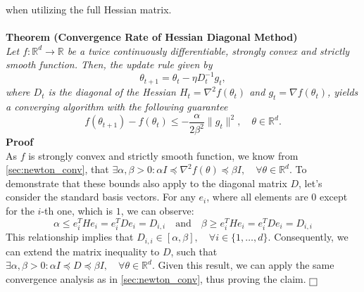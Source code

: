 when utilizing the full Hessian matrix.
\\\\
\noindent\textbf{Theorem (Convergence Rate of Hessian Diagonal Method) \cite{yao2021adahessian}} \\
\textit{Let $f: \mathbb{R}^d \to \mathbb{R}$ be a twice continuously differentiable, strongly convex and strictly smooth function. Then, the update rule given by
    \[ \theta_{t+1} = \theta_t - \eta D_t^{-1} g_t, \]
    where $D_t$ is the diagonal of the Hessian $H_t = \nabla^2 f(\theta_t)$ and $g_t = \nabla f(\theta_t)$, yields a converging algorithm with the following guarantee
    \[ f(\theta_{t+1}) - f(\theta_t) \leq - \frac{\alpha}{2\beta^{2}} \|g_t\|^2, \quad \theta \in \mathbb{R}^d. \]
   }\noindent\textbf{Proof}\\ As $f$ is strongly convex and strictly smooth function, we know from \ref{sec:newton_conv}, that $\exists \alpha, \beta > 0 : \alpha I \preceq \nabla^2 f(\theta) \preceq \beta I, \quad \forall \theta \in \mathbb{R}^d$.
    To demonstrate that these bounds also apply to the diagonal matrix $D$, let's consider the standard basis vectors.
For any $e_i$, where all elements are $0$ except for the $i$-th one, which is $1$, we can observe:
\begin{equation}
       \alpha \leq e_i^T H e_i = e_i^T D e_i = D_{i,i} \quad \text{and} \quad \beta \geq e_i^T H e_i = e_i^T D e_i = D_{i,i}
\end{equation}   
This relationship implies that $D_{i,i} \in [\alpha,\beta], \quad \forall i \in \{1, \ldots, d\}$.
Consequently, we can extend the matrix inequality to $D$, such that   
   $\exists \alpha, \beta > 0 : \alpha I \preceq D \preceq \beta I, \quad \forall \theta \in \mathbb{R}^d$.   
Given this result, we can apply the same convergence analysis as in \ref{sec:newton_conv}, thus proving the claim. $ \hfill \fbox{\phantom{\rule{.2ex}{.2ex}}}$
\\







